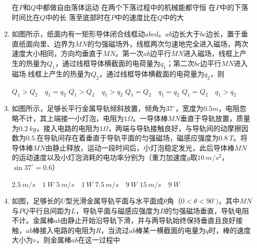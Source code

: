 \begin{enumerate}
\begin{figure}[h!]
\centering

\end{figure}

\fourchoices
{在$ P $和$ Q $中都做自由落体运动}
{在两个下落过程中的机械能都守恒}
{在$ P $中的下落时间比在$ Q $中的长}
{落至底部时在$ P $中的速度比在$ Q $中的大}


\item 
{}
如图所示，纸面内有一矩形导体闭合线框动$ abcd $。$ ab $边长大于$ bc $边长，置于垂直纸面向里、边界为$ MN $的匀强磁场外，线框两次匀速地完全进入磁场，两次速度大小相同，方向均垂直于$ MN $。第一次$ ab $边平行$ MN $进入磁场，线框上产生的热量为$ Q_{1} $，通过线框导体横截面的电荷量为$ q_{1} $；第二次$ bc $边平行$ MN $进入磁场.线框上产生的热量为$ Q_{2} $，通过线框导体横截面的电荷量为$ q_{2} $，则  
\begin{figure}[h!]
\centering

\end{figure}


\fourchoices
{$ Q_{1} > Q_{2} \quad q_{1} = q_{2} $ }
{$ Q_{1} > Q_{2} \quad q_{1} > q_{2} $}
{$ Q_{1} = Q_{2} \quad q_{1} = q_{2} $ }
{$ Q_{1} = Q_{2} \quad q_{1} > q_{2} $}




\item 
{}
如图所示，足够长平行金属导轨倾斜放置，倾角为$ 37 ^{ \circ } $，宽度为$ 0.5m $，电阻忽略不计，其上端接一小灯泡，电阻为$ 1 \Omega $。一导体棒$ MN $垂直于导轨放置，质量为$ 0.2 \ kg $，接入电路的电阻为$ 1 \Omega $，两端与导轨接触良好，与导轨间的动摩擦因数为$ 0.5 $.在导轨间存在着垂直于导轨平面的匀强磁场，磁感应强度为$ 0.8 \ T $。将导体棒$ MN $由静止释放，运动一段时间后，小灯泡稳定发光，此后导体棒$ MN $的运动速度以及小灯泡消耗的电功率分别为（重力加速度$ g $取$ 10 \ m/s ^{2} $，$ \sin 37 ^{ \circ } =0.6 $）  
\begin{figure}[h!]
\centering

\end{figure}


\fourchoices
{$ 2.5 \ m/s \quad 1 \ W $ }
{$ 5 \ m/s \quad 1 \ W $}
{$ 7.5 \ m/s \quad 9 \ W $ }
{$ 15 \ m/s \quad 9 \ W $}

\item 
{}
如图，足够长的$ U $型光滑金属导轨平面与水平面成$ \theta $角（$ 0 < \theta <90 ^{ \circ } ) $，其中$ MN $与$ PQ $平行且间距为$ L $，导轨平面与磁感应强度为$ B $的匀强磁场垂直，导轨电阻不计。金属棒$ ab $由静止开始沿导轨下滑，并与两导轨始终保持垂直且良好接触，$ ab $棒接入电路的电阻为$ R $，当流过$ ab $棒某一横截面的电量为$ q $时，棒的速度大小为$ v $，则金属棒$ ab $在这一过程中  
\begin{figure}[h!]
\centering

\end{figure}



\end{enumerate}
